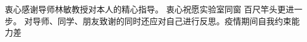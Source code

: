 \begin{acknowledgement}
    衷心感谢导师林敏教授对本人的精心指导。
    衷心祝愿实验室同窗 百尺竿头更进一步。
    对导师、同学、朋友致谢的同时还应对自己进行反思。疫情期间自我约束能力差
\end{acknowledgement}
